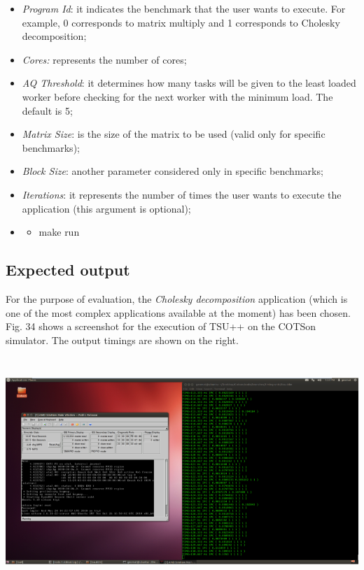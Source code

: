 \documentclass[a4paper]{article}
\begin{document}
\begin{itemize}
\item {
\textit{Program Id}: it indicates the benchmark that the user wants to
execute. For example, 0 corresponds to matrix multiply and 1
corresponds to Cholesky decomposition;}
\item {
\textit{Cores:} represents the number of cores;}
\item {
\textit{AQ Threshold}: it determines how many tasks will be given to the
least loaded worker before checking for the next worker with the
minimum load. The default is 5;}
\item {
\textit{Matrix Size}: is the size of the matrix to be used (valid only
for specific benchmarks);}
\item {
\textit{Block Size}: another parameter considered only in specific
benchmarks;}
\item {
\textit{Iterations}: it represents the number of times the user wants to
execute the application (this argument is optional);}
\end{itemize}
\begin{itemize}
\item \begin{itemize}
\item {
make run}
\end{itemize}
\end{itemize}
\subsection[Expected output]{Expected output}
{
For the purpose of evaluation, the \textit{Cholesky decomposition}
application (which is one of the most complex applications available at
the moment) has been chosen. Fig. 34 shows a screenshot for the
execution of TSU++ on the COTSon simulator. The output timings are
shown on the right. }

{\centering 
\includegraphics[width=6.4146in,height=3.3945in]{img50.png}
\par}
\end{document}

